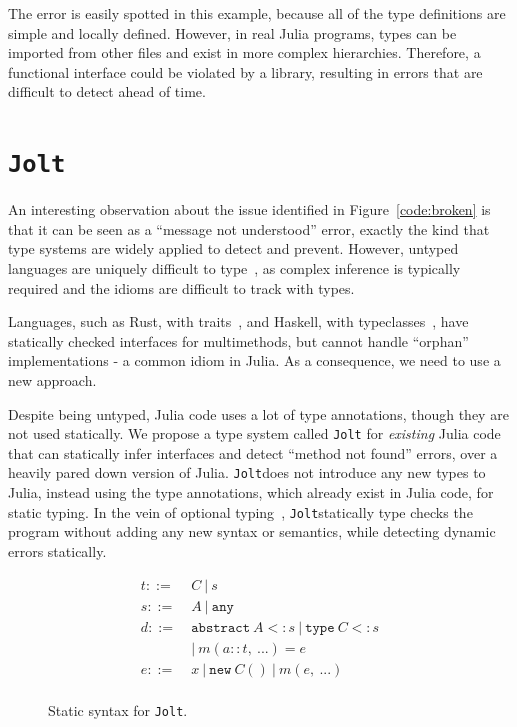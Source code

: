 \documentclass[preprint]{sigplanconf}
\newcommand{\xt}[1]{\texttt{#1}}
\newcommand{\abstype}[2]{\xt{abstract}~#1 <: #2}
\newcommand{\oftype}[2]{#1::#2}
\newcommand{\m}[2]{{#1}(#2)}
\newcommand{\contype}[2]{\xt{type}~#1 <: #2}
\newcommand{\any}{\xt{any}}
\newcommand{\jolt}{\xt{Jolt}}
\renewcommand{\ldots}{...}
\begin{document}
The error is easily spotted in this example, because all of the type definitions
are simple and locally defined. However, in real Julia programs, types can be
imported from other files and exist in more complex hierarchies. Therefore, 
a functional interface could be violated by a library, resulting in
errors that are difficult to detect ahead of time.

\section{\jolt}
An interesting observation about the issue identified in Figure~\ref{code:broken}
is that it can be seen as a ``message not understood'' error, exactly the kind
that type systems are widely applied to detect and prevent. However, untyped 
languages are uniquely difficult to type~\cite{cannonpython}, as complex inference is typically
required and the idioms are difficult to track with types.

Languages, such as Rust, with traits~\cite{rust}, and Haskell, with 
typeclasses~\cite{typeclasses}, have statically checked interfaces for multimethods, but 
cannot handle ``orphan'' implementations - a common idiom in Julia. As a 
consequence, we need to use a new approach.

Despite being untyped, Julia code uses a lot of type annotations, though they 
are not used statically. We propose a type system called \jolt\space
for \emph{existing} Julia code that can statically infer interfaces and detect
``method not found'' errors, over a heavily pared down version of Julia.
\jolt\space does not introduce any new types to Julia, instead using the
type annotations, which already exist in Julia code, for static typing.
In the vein of optional typing~\cite{bracha}, \jolt\space statically type checks
the program without adding any new syntax or semantics, while detecting dynamic errors statically.


\begin{figure}
\begin{align*}
t ::=~& C ~|~ s\\
s ::=~& A ~|~ \any\\
d ::=~& \abstype{A}{s} ~|~ \contype{C}{s} \\
  & |~ \m{m}{\oftype{a}{t}, ~\ldots} = e\\
e ::=~& x ~|~ \xt{new} ~ C() ~|~ m(e,~\ldots) \\
\end{align*}
\caption{Static syntax for \jolt.}
\label{fm:syntax}
\end{figure}
\end{document}
